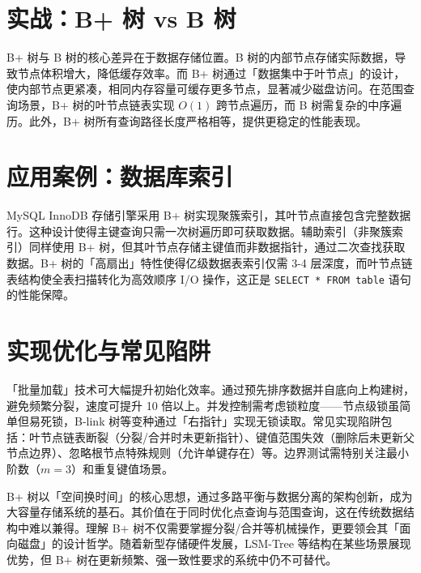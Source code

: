 \chapter{实战：B+ 树 vs B 树}
B+ 树与 B 树的核心差异在于数据存储位置。B 树的内部节点存储实际数据，导致节点体积增大，降低缓存效率。而 B+ 树通过「数据集中于叶节点」的设计，使内部节点更紧凑，相同内存容量可缓存更多节点，显著减少磁盘访问。在范围查询场景，B+ 树的叶节点链表实现 $O(1)$ 跨节点遍历，而 B 树需复杂的中序遍历。此外，B+ 树所有查询路径长度严格相等，提供更稳定的性能表现。\par
\chapter{应用案例：数据库索引}
MySQL InnoDB 存储引擎采用 B+ 树实现聚簇索引，其叶节点直接包含完整数据行。这种设计使得主键查询只需一次树遍历即可获取数据。辅助索引（非聚簇索引）同样使用 B+ 树，但其叶节点存储主键值而非数据指针，通过二次查找获取数据。B+ 树的「高扇出」特性使得亿级数据表索引仅需 3-4 层深度，而叶节点链表结构使全表扫描转化为高效顺序 I/O 操作，这正是 \texttt{SELECT * FROM table} 语句的性能保障。\par
\chapter{实现优化与常见陷阱}
「批量加载」技术可大幅提升初始化效率。通过预先排序数据并自底向上构建树，避免频繁分裂，速度可提升 10 倍以上。并发控制需考虑锁粒度——节点级锁虽简单但易死锁，B-link 树等变种通过「右指针」实现无锁读取。常见实现陷阱包括：叶节点链表断裂（分裂/合并时未更新指针）、键值范围失效（删除后未更新父节点边界）、忽略根节点特殊规则（允许单键存在）等。边界测试需特别关注最小阶数（$m=3$）和重复键值场景。\par
B+ 树以「空间换时间」的核心思想，通过多路平衡与数据分离的架构创新，成为大容量存储系统的基石。其价值在于同时优化点查询与范围查询，这在传统数据结构中难以兼得。理解 B+ 树不仅需要掌握分裂/合并等机械操作，更要领会其「面向磁盘」的设计哲学。随着新型存储硬件发展，LSM-Tree 等结构在某些场景展现优势，但 B+ 树在更新频繁、强一致性要求的系统中仍不可替代。\par
